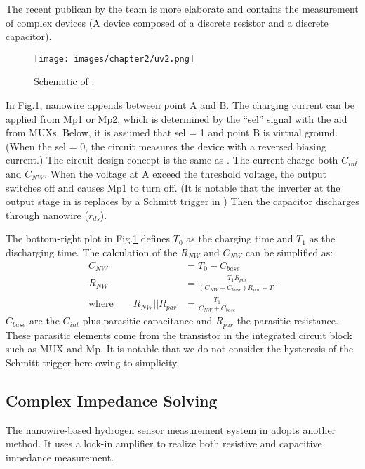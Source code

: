 The recent publican \cite{Juv2} by the team is more elaborate and contains the measurement of complex devices (A device composed of a discrete resistor and a discrete capacitor).
\begin{figure}[!htbp]
    \centering
    \texttt{[image: images/chapter2/uv2.png]}
    \caption{Schematic of \cite{Juv2}.}
    \label{fig:tot2}
\end{figure}

In Fig.\ref{fig:tot2}, nanowire appends between point A and B.
The charging current can be applied from Mp1 or Mp2, which is determined by the ``sel'' signal with the aid from MUXs.
Below, it is assumed that sel = 1 and point B is virtual ground.
(When the sel = 0, the circuit measures the device with a reversed biasing current.)
The circuit design concept is the same as \cite{Juv1}.
The current charge both $C_{int}$ and $C_{NW}$.
When the voltage at A exceed the threshold voltage, the output switches off and causes Mp1 to turn off.
(It is notable that the inverter at the output stage in \cite{Juv1} is replaces by a Schmitt trigger in \cite{Juv2})
Then the capacitor discharges through nanowire ($r_{ds}$).

The bottom-right plot in Fig.\ref{fig:tot2} defines $T_0$ as the charging time and $T_1$ as the discharging time.
The calculation of the $R_{NW}$ and $C_{NW}$  can be simplified as:
\setlength{\mathindent}{2cm}
\begin{align}
                         C_{NW}            & = T_0 - C_{base}\\
                         R_{NW}            & = \frac{T_1R_{par}}{(C_{NW} + C_{base})R_{par} - T_1}\\
    \text{where} \qquad  R_{NW} || R_{par} & = \frac{T_1}{C_{NW} + C_{base}}
\end{align}
$C_{base}$ are the $C_{int}$ plus parasitic capacitance and $R_{par}$ the parasitic resistance.
These parasitic elements come from the transistor in the integrated circuit block such as MUX and Mp.
It is notable that we do not consider the hysteresis of the Schmitt trigger here owing to simplicity.


\subsection{Complex Impedance Solving}
The nanowire-based hydrogen sensor measurement system in \cite{Jlockin} adopts another method.
It uses a lock-in amplifier to realize both resistive and capacitive impedance measurement.

